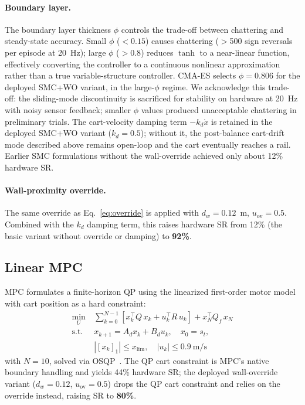 \paragraph{Boundary layer.}
The boundary layer thickness $\phi$ controls the trade-off between
chattering and steady-state accuracy.  Small $\phi$ (${<}0.15$)
causes chattering ($>$500 sign reversals per episode at 20~Hz);
large $\phi$ (${>}0.8$) reduces $\tanh$ to a near-linear function,
effectively converting the controller to a continuous nonlinear
approximation rather than a true variable-structure controller.
CMA-ES selects $\phi{=}0.806$ for the deployed SMC+WO variant,
in the large-$\phi$ regime. We acknowledge this trade-off:
the sliding-mode discontinuity is sacrificed for
stability on hardware at 20~Hz with noisy sensor feedback;
smaller $\phi$ values produced unacceptable chattering in preliminary trials.
The cart-velocity damping term $-k_d\dot{x}$ is retained in the deployed
SMC+WO variant ($k_d{=}0.5$); without it, the post-balance cart-drift mode
described above remains open-loop and the cart eventually reaches a
rail. Earlier SMC formulations without the wall-override achieved only
about 12\% hardware SR.

\paragraph{Wall-proximity override.}
The same override as Eq.~\eqref{eq:override} is applied with
$d_w{=}0.12$~m, $u_\text{ov}{=}0.5$. Combined with the $k_d$ damping
term, this raises hardware SR from 12\% (the basic variant without
override or damping) to \textbf{92\%}.

\subsection{Linear MPC}

MPC formulates a finite-horizon QP using the linearized
first-order motor model with cart position as a hard constraint:
\begin{equation}
\begin{aligned}
  \min_{U}\ & \sum_{k=0}^{N-1} \left[ x_k^\top Q\, x_k + u_k^\top R\, u_k \right]
  + x_N^\top Q_f\, x_N \\
  \text{s.t. }\ & x_{k+1} = A_d x_k + B_d u_k,\quad x_0 = s_t,\\
  & |[x_k]_1| \leq x_\text{lim},\quad |u_k| \leq 0.9~\text{m/s}
\end{aligned}
\end{equation}
with $N{=}10$, solved via OSQP~\cite{osqp}.
The QP cart constraint is MPC's native boundary handling and yields
44\% hardware SR; the deployed wall-override variant
($d_w{=}0.12$, $u_\text{ov}{=}0.5$) drops the QP cart constraint and
relies on the override instead, raising SR to \textbf{80\%}.

